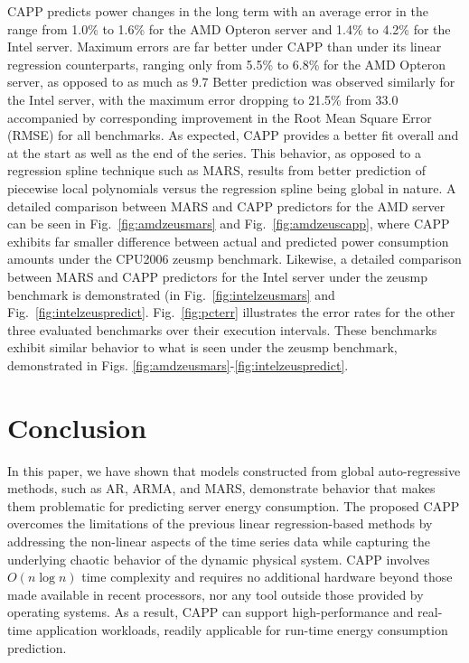\documentclass[times,10pt,finalversion]{usetex-v1}
\renewcommand{\figurename}{Fig.}
\begin{document}
CAPP predicts power changes in the long term with an average error in
the range from 1.0\% to 1.6\% for the AMD Opteron server and 1.4\% to
4.2\% for the Intel server.  Maximum errors are far better under CAPP than under its
linear regression counterparts, ranging only from 5.5\% to 6.8\% for the
AMD Opteron server, as opposed to as much as 9.7%
Better prediction was observed similarly for the Intel server,
with the maximum error dropping to 21.5\% from 33.0%
accompanied by corresponding improvement in the Root Mean Square Error (RMSE) for all benchmarks.
As expected, CAPP provides a better fit overall and at the
start as well as the end of the series.  This behavior, as opposed to a
regression spline technique such as MARS, results from better prediction
of piecewise local polynomials versus the regression spline being global
in nature. A detailed comparison between MARS and CAPP predictors for
the AMD server can be seen in \figurename~\ref{fig:amdzeusmars} and
\figurename~\ref{fig:amdzeuscapp}, where CAPP exhibits far smaller
difference between actual and predicted power consumption amounts under
the CPU2006 zeusmp benchmark.  Likewise, a detailed comparison between
MARS and CAPP predictors for the Intel server under the zeusmp benchmark
is demonstrated (in \figurename~\ref{fig:intelzeusmars} and
\figurename~\ref{fig:intelzeuspredict}. \figurename~\ref{fig:pcterr}
illustrates the error rates for the other three evaluated benchmarks
over their execution intervals.  These benchmarks exhibit similar
behavior to what is seen under the zeusmp benchmark, demonstrated in
Figs. \ref{fig:amdzeusmars}-\ref{fig:intelzeuspredict}.
\section{Conclusion}
\label{sec:conclusions}
In this paper, we have shown that models constructed from global
auto-regressive methods, such as AR, ARMA, and MARS, demonstrate
behavior that makes them problematic for predicting server energy
consumption.  The proposed CAPP overcomes the limitations of the
previous linear regression-based methods by addressing the non-linear
aspects of the time series data while capturing the underlying chaotic
behavior of the dynamic physical system.  CAPP involves $O(n\log{n})$
time complexity and requires no additional hardware beyond those
made available in recent processors, nor any tool outside those
provided by operating systems. As a result, CAPP can support
high-performance and real-time application workloads, readily applicable
for run-time energy consumption prediction.
\label{sec:references} 

\begin{small}
  
\end{small}
\end{document}
